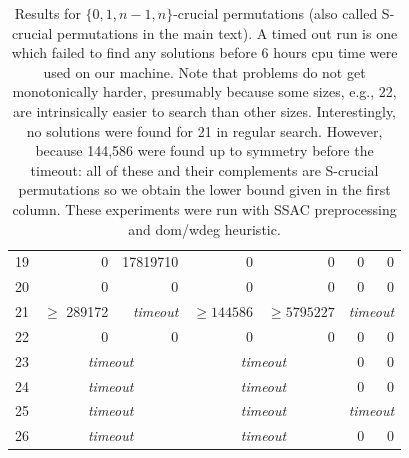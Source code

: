 \documentclass[12pt,reqno]{article}
\begin{document}
\begin{table}[H]
\begin{center}
{\begin{tabular}{r|rr|rr|rr}
19 &            0 &     17819710 &            0 &            0 &            0 &            0 \\
20 &            0 &            0 &            0 &            0 &            0 &            0 \\
21 & $\geq$ 289172& {\emph{timeout}}  &      $\geq 144586$ &    $\geq  5795227$ &          \multicolumn{2}{c}{\emph{timeout}} \\
22 &            0 &            0 &            0 &            0 &            0 &            0 \\
23 &             \multicolumn{2}{c|}{\emph{timeout}}  &         \multicolumn{2}{c|}{\emph{timeout}}  &            0 &            0 \\
24 &              \multicolumn{2}{c|}{\emph{timeout}}  &         \multicolumn{2}{c|}{\emph{timeout}} &            0 &            0 \\
25 &              \multicolumn{2}{c|}{\emph{timeout}}  &         \multicolumn{2}{c|}{\emph{timeout}}&      \multicolumn{2}{c}{\emph{timeout}}  \\
26 &              \multicolumn{2}{c|}{\emph{timeout}}  &         \multicolumn{2}{c|}{\emph{timeout}}&            0 &            0 \\

\end{tabular}
}
\end{center}
\caption{Results for $\{0,1,n-1, n\}$-crucial permutations (also called S-crucial permutations in the main text).   A timed out run is one which failed to find any solutions before 6 hours cpu time were used on our machine.  Note that problems do not get monotonically harder, presumably because some sizes, e.g., 22, are intrinsically easier to search than other sizes.   Interestingly, 
no solutions were found for 21 in regular search. However, because  144,586 were found up to symmetry before the timeout: all of these and their complements  are S-crucial permutations so we obtain the lower bound given in the first column. These experiments were run with SSAC preprocessing and dom/wdeg heuristic.}
\label{tab:01n1n}
\end{table}
\end{document}
